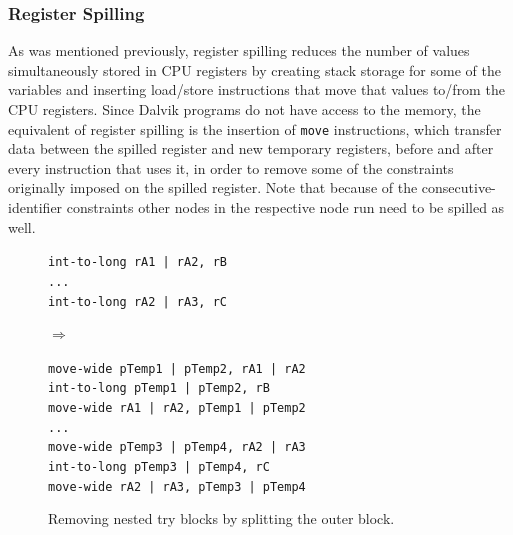 \documentclass[12pt,twoside,notitlepage]{report}
\newcommand{\asm}[1] {\texttt{#1}}
\begin{document}
\subsubsection{Register Spilling}

As was mentioned previously, register spilling reduces the number of values simultaneously stored in CPU registers by creating stack storage for some of the variables and inserting load/store instructions that move that values to/from the CPU registers. Since Dalvik programs do not have access to the memory, the equivalent of register spilling is the insertion of \verb$move$ instructions, which transfer data between the spilled register and new temporary registers, before and after every instruction that uses it, in order to remove some of the constraints originally imposed on the spilled register. Note that because of the consecutive-identifier constraints other nodes in the respective node run need to be spilled as well.

\begin{figure}
	\centering
	\begin{minipage}{0.325\textwidth}
	\begin{footnotesize}
		\asm{int-to-long rA1 | rA2, rB} \\
		\asm{...} \\
		\asm{int-to-long rA2 | rA3, rC}
	\end{footnotesize}
	\end{minipage}
	\begin{minipage}{0.09\textwidth}
	\centering
	$\Rightarrow$
	\end{minipage}
	\begin{minipage}{0.465\textwidth}
	\begin{footnotesize}
		\asm{move-wide pTemp1 | pTemp2, rA1 | rA2} \\
		\asm{int-to-long pTemp1 | pTemp2, rB} \\
		\asm{move-wide rA1 | rA2, pTemp1 | pTemp2} \\
		\asm{...} \\
		\asm{move-wide pTemp3 | pTemp4, rA2 | rA3} \\
		\asm{int-to-long pTemp3 | pTemp4, rC} \\
		\asm{move-wide rA2 | rA3, pTemp3 | pTemp4}
	\end{footnotesize}
	\end{minipage}
	\caption{Removing nested try blocks by splitting the outer block.}
	\label{figure:Reassembling_RegisterSpilling}
\end{figure}
\end{document}
